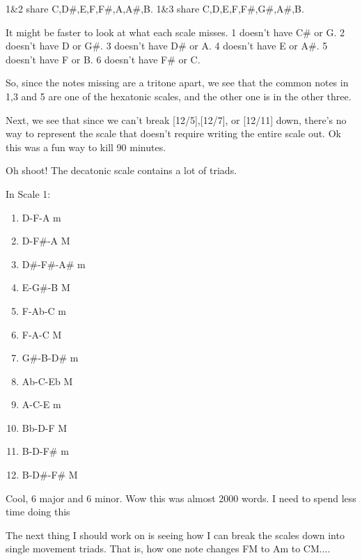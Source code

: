 \documentclass[12pt]{article}[titlepage]
\newcommand{\1}{\={a}}
\newcommand{\2}{\={e}}
\newcommand{\3}{\={\i}}
\newcommand{\4}{\=o}
\newcommand{\5}{\=u}
\newcommand{\6}{\={A}}
\renewcommand{\,}{\textsuperscript{,}}
\begin{document}
1\&2 share C,D\#,E,F,F\#,A,A\#,B.
1\&3 share C,D,E,F,F\#,G\#,A\#,B.

It might be faster to look at what each scale misses.
1 doesn't have C\# or G.
2 doesn't have D or G\#.
3 doesn't have D\# or A.
4 doesn't have E or A\#.
5 doesn't have F or B.
6 doesn't have F\# or C.

So, since the notes missing are a tritone apart, we see that the common notes in 1,3 and 5 are one of the hexatonic scales, and the other one is in the other three.

Next, we see that since we can't break [12/5],[12/7], or [12/11] down, there's no way to represent the scale that doesn't require writing the entire scale out.
Ok this was a fun way to kill 90 minutes.

Oh shoot!
The decatonic scale contains a lot of triads.

In Scale 1:
\begin{enumerate}
\item D-F-A m 
\item D-F\#-A M 
\item D\#-F\#-A\# m
\item E-G\#-B M
\item F-Ab-C m
\item F-A-C M
\item G\#-B-D\# m
\item Ab-C-Eb M
\item A-C-E m
\item Bb-D-F M
\item B-D-F\# m
\item B-D\#-F\# M
\end{enumerate}

Cool, 6 major and 6 minor.
Wow this was almost 2000 words.
I need to spend less time doing this

The next thing I should work on is seeing how I can break the scales down into single movement triads.
That is, how one note changes FM to Am to CM.... 
\end{document}
